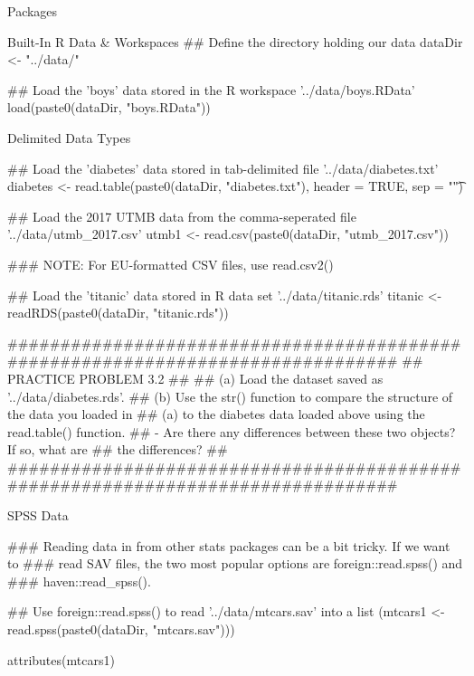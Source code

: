 \documentclass[10pt]{beamer}
\begin{document}
\begin{frame}{Packages}
\begin{frame}[fragile]{Built-In R Data \& Workspaces}
## Define the directory holding our data
dataDir <- "../data/"

## Load the 'boys' data stored in the R workspace '../data/boys.RData'
load(paste0(dataDir, "boys.RData"))

\end{frame}


\begin{frame}[fragile]{Delimited Data Types}

## Load the 'diabetes' data stored in tab-delimited file '../data/diabetes.txt'
diabetes <- read.table(paste0(dataDir, "diabetes.txt"),
                       header = TRUE,
                       sep = "\t")

## Load the 2017 UTMB data from the comma-seperated file '../data/utmb_2017.csv'
utmb1 <- read.csv(paste0(dataDir, "utmb_2017.csv"))

### NOTE: For EU-formatted CSV files, use read.csv2()

## Load the 'titanic' data stored in R data set '../data/titanic.rds'
titanic <- readRDS(paste0(dataDir, "titanic.rds"))

################################################################################
## PRACTICE PROBLEM 3.2
##
## (a) Load the dataset saved as '../data/diabetes.rds'.
## (b) Use the str() function to compare the structure of the data you loaded in
##     (a) to the diabetes data loaded above using the read.table() function.
##     - Are there any differences between these two objects? If so, what are
##       the differences?
##
################################################################################

\end{frame}


\begin{frame}[fragile]{SPSS Data}

### Reading data in from other stats packages can be a bit tricky. If we want to
### read SAV files, the two most popular options are foreign::read.spss() and
### haven::read_spss().

## Use foreign::read.spss() to read '../data/mtcars.sav' into a list
(mtcars1 <- read.spss(paste0(dataDir, "mtcars.sav")))

attributes(mtcars1)


\end{frame}
\end{frame}
\end{document}
